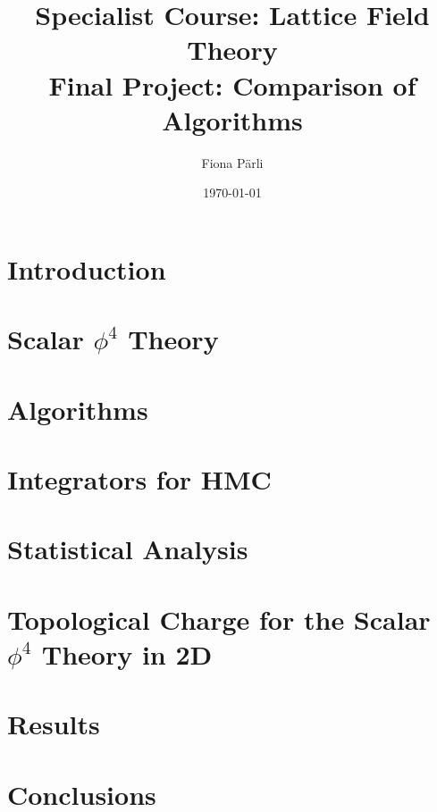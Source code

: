 \documentclass[notitlepage]{report}%
\numberwithin{equation}{section}
\numberwithin{algorithm}{section}
\begin{document}

\title{Specialist Course: Lattice Field Theory \\ Final Project: Comparison of Algorithms}
\author{Fiona Pärli}
\date{\today}

\maketitle
\setcounter{tocdepth}{2}
\tableofcontents

\chapter{Introduction}

\chapter{Scalar \texorpdfstring{$\phi^4$}{phi4} Theory}

\chapter{Algorithms}
 

\chapter{Integrators for HMC}\label{sec: integrators}

\chapter{Statistical Analysis}

\chapter{Topological Charge for the Scalar \texorpdfstring{$\phi^4$}{phi4} Theory in 2D}\label{sec:topology}

\chapter{Results}

\chapter{Conclusions}

\printbibliography
\end{document}
